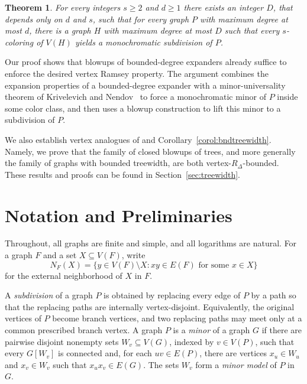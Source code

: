 \documentclass[11pt]{article}
\newtheorem{theorem}{Theorem}
\theoremstyle{definition}
\begin{document}
\begin{theorem}\label{thm:main}
  For every integers $s \ge 2$ and  $d \ge 1$ there exists an integer $D$, that depends only on $d$ and $s$, such that for every graph $P$ with maximum degree at most $ d$, there is a graph $H$ with maximum degree at most $D$ such that every $s$-coloring of $V(H)$ yields a monochromatic subdivision of $P$.
\end{theorem}
 
Our proof shows that blowups of bounded-degree expanders already suffice to enforce the desired vertex Ramsey property. The argument combines the expansion properties of a bounded-degree expander with a minor-universality theorem of Krivelevich and Nendov~\cite{KN}
to force a monochromatic minor of $P$ inside some color class, and then uses a blowup construction to lift this minor to a subdivision of $P$.

We also establish vertex analogues of \cite{HornMilansRodl2014} and Corollary~\ref{corol:bndtreewidth}. Namely, we prove that the family of closed blowups of trees, and more generally the family of graphs with bounded treewidth, are both vertex-$R_\Delta$-bounded. These results and proofs can be found in Section~\ref{sec:treewidth}.

\section{Notation and Preliminaries}

Throughout, all graphs are finite and simple, and all logarithms are
natural. For a graph $F$ and a set $X\subseteq V(F)$, write
\[
N_F(X)=\{y\in V(F)\setminus X: xy\in E(F)\text{ for some }x\in X\}
\]
for the external neighborhood of $X$ in $F$.

A \emph{subdivision} of a graph $P$ is obtained by replacing every edge of
$P$ by a path so that the replacing paths are internally vertex-disjoint.
Equivalently, the original vertices of $P$ become branch vertices, and two
replacing paths may meet only at a common prescribed branch vertex. A graph
$P$ is a \emph{minor} of a graph $G$ if there are pairwise disjoint
nonempty sets $W_v\subseteq V(G)$, indexed by $v\in V(P)$, such that every
$G[W_v]$ is connected and, for each $uv\in E(P)$, there are vertices 
$x_u \in W_u$ and $x_v \in W_v$ such that $x_ux_v \in E(G)$. The sets $W_v$ form a \emph{minor model} of $P$ in $G$.
\end{document}

